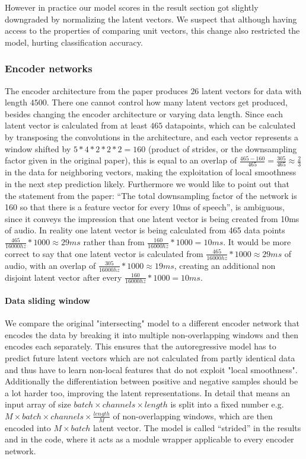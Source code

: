 However in practice our model scores in the result section got slightly downgraded by normalizing the latent vectors. We suspect that although having access to the properties of comparing unit vectors, this change also restricted the model, hurting classification accuracy.

\subsubsection{Encoder networks}
The encoder architecture from the paper produces $26$ latent vectors for data with length $4500$. There one cannot control how many latent vectors get produced, besides changing the encoder architecture or varying data length. Since each latent vector is calculated from at least $465$ datapoints, which can be calculated by transposing the convolutions in the architecture, and each vector represents a window shifted by $5*4*2*2*2=160$ (product of strides, or the downsampling factor given in the original paper), this is equal to an overlap of $\frac{465-160}{465}=\frac{305}{465}\approx\frac{2}{3}$ in the data for neighboring vectors, making the exploitation of local smoothness in the next step prediction likely. Furthermore we would like to point out that the statement from the paper: \enquote{The total downsampling factor of the network is 160 so that there is a feature vector for every 10ms of speech}, is ambiguous, since it conveys the impression that one latent vector is being created from 10ms of audio. In reality one latent vector is being calculated from 465 data points $\frac{465}{16000\mathit{hz}}*1000\approx29\mathit{ms}$ rather than from $\frac{160}{16000\mathit{hz}}*1000=10\mathit{ms}$. It would be more correct to say that one latent vector is calculated from $\frac{465}{16000\mathit{hz}}*1000\approx29\mathit{ms}$ of audio, with an overlap of $\frac{305}{16000\mathit{hz}}*1000\approx19\mathit{ms}$, creating an additional non disjoint latent vector after every $\frac{160}{16000\mathit{hz}}*1000=10\mathit{ms}$.
\paragraph{Data sliding window} \label{sec:cpc-strided}
We compare the original "intersecting" model to a different encoder network that encodes the data by breaking it into multiple non-overlapping windows and then encodes each separately. This ensures that the autoregressive model has to predict future latent vectors which are not calculated from partly identical data and thus have to learn non-local features that do not exploit "local smoothness". Additionally the differentiation between positive and negative samples should be a lot harder too, improving the latent representations. In detail that means an input array of size $\mathit{batch} \times \mathit{channels} \times \mathit{length}$ is split into a fixed number e.g. $M \times \mathit{batch} \times \mathit{channels} \times \frac{\mathit{length}}{M}$ of non-overlapping windows, which are then encoded into $M \times \mathit{batch}$ latent vector. The model is called \enquote{strided} in the results and  in the code, where it acts as a module wrapper applicable to every encoder network.


